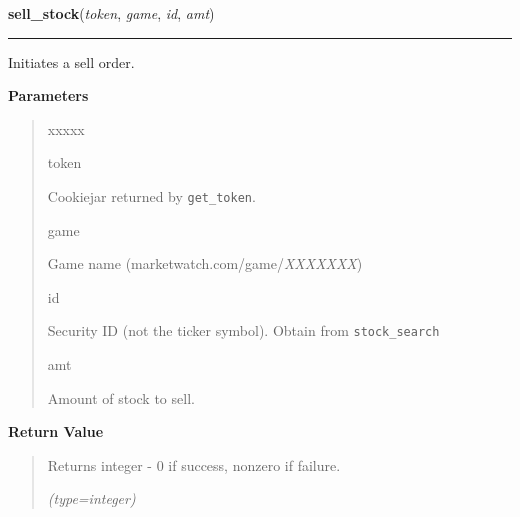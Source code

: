 \hspace{.8\funcindent}\begin{boxedminipage}{\funcwidth}

    \raggedright \textbf{sell\_stock}(\textit{token}, \textit{game}, \textit{id}, \textit{amt})

    \vspace{-1.5ex}

    \rule{\textwidth}{0.5\fboxrule}
\setlength{\parskip}{2ex}
    Initiates a sell order.

\setlength{\parskip}{1ex}
      \textbf{Parameters}
      \vspace{-1ex}

      \begin{quote}
        \begin{Ventry}{xxxxx}

          \item[token]

          Cookiejar returned by \texttt{get\_token}.

          \item[game]

          Game name (marketwatch.com/game/\textit{XXXXXXX})

          \item[id]

          Security ID (not the ticker symbol). Obtain from 
          \texttt{stock\_search}

          \item[amt]

          Amount of stock to sell.

        \end{Ventry}

      \end{quote}

      \textbf{Return Value}
    \vspace{-1ex}

      \begin{quote}
      Returns integer - 0 if success, nonzero if failure.

      {\it (type=integer)}

      \end{quote}

    \end{boxedminipage}

    \label{moira:stock_search}

    \vspace{0.5ex}

